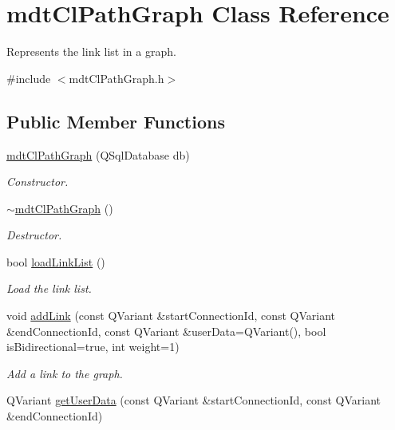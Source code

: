 \hypertarget{classmdt_cl_path_graph}{\section{mdt\-Cl\-Path\-Graph Class Reference}
\label{classmdt_cl_path_graph}
}


Represents the link list in a graph.  




{\ttfamily \#include $<$mdt\-Cl\-Path\-Graph.\-h$>$}

\subsection*{Public Member Functions}
\begin{DoxyCompactItemize}
\item 
\hyperlink{classmdt_cl_path_graph_a3d2b4b4b0f32dc166e59e3c5384492e9}{mdt\-Cl\-Path\-Graph} (Q\-Sql\-Database db)
\begin{DoxyCompactList}\small\item\em Constructor. \end{DoxyCompactList}\item 
\hyperlink{classmdt_cl_path_graph_aa72798f4edc19fc69d32cd5d7d643bb8}{$\sim$mdt\-Cl\-Path\-Graph} ()
\begin{DoxyCompactList}\small\item\em Destructor. \end{DoxyCompactList}\item 
bool \hyperlink{classmdt_cl_path_graph_a40e80f68b2600ad69a1fe74aa40393f8}{load\-Link\-List} ()
\begin{DoxyCompactList}\small\item\em Load the link list. \end{DoxyCompactList}\item 
void \hyperlink{classmdt_cl_path_graph_a14a5580402b273eb6707939ee122fa95}{add\-Link} (const Q\-Variant \&start\-Connection\-Id, const Q\-Variant \&end\-Connection\-Id, const Q\-Variant \&user\-Data=Q\-Variant(), bool is\-Bidirectional=true, int weight=1)
\begin{DoxyCompactList}\small\item\em Add a link to the graph. \end{DoxyCompactList}\item 
Q\-Variant \hyperlink{classmdt_cl_path_graph_a82df1588f1b4a9df7b25760ebd9e5aa1}{get\-User\-Data} (const Q\-Variant \&start\-Connection\-Id, const Q\-Variant \&end\-Connection\-Id)

\end{DoxyCompactItemize}
